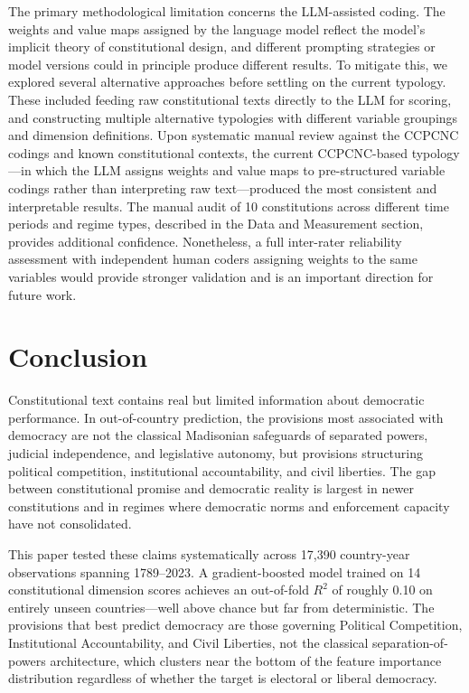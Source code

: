 \documentclass[9pt,twoside]{pnas-new}
\begin{document}
The primary methodological limitation concerns the LLM-assisted coding. The weights and value maps assigned by the language model reflect the model's implicit theory of constitutional design, and different prompting strategies or model versions could in principle produce different results. To mitigate this, we explored several alternative approaches before settling on the current typology. These included feeding raw constitutional texts directly to the LLM for scoring, and constructing multiple alternative typologies with different variable groupings and dimension definitions. Upon systematic manual review against the CCPCNC codings and known constitutional contexts, the current CCPCNC-based typology---in which the LLM assigns weights and value maps to pre-structured variable codings rather than interpreting raw text---produced the most consistent and interpretable results. The manual audit of 10 constitutions across different time periods and regime types, described in the Data and Measurement section, provides additional confidence. Nonetheless, a full inter-rater reliability assessment with independent human coders assigning weights to the same variables would provide stronger validation and is an important direction for future work.

\section*{Conclusion}

Constitutional text contains real but limited information about democratic performance. In out-of-country prediction, the provisions most associated with democracy are not the classical Madisonian safeguards of separated powers, judicial independence, and legislative autonomy, but provisions structuring political competition, institutional accountability, and civil liberties. The gap between constitutional promise and democratic reality is largest in newer constitutions and in regimes where democratic norms and enforcement capacity have not consolidated.

This paper tested these claims systematically across 17,390 country-year observations spanning 1789--2023. A gradient-boosted model trained on 14 constitutional dimension scores achieves an out-of-fold $R^2$ of roughly 0.10 on entirely unseen countries---well above chance but far from deterministic. The provisions that best predict democracy are those governing Political Competition, Institutional Accountability, and Civil Liberties, not the classical separation-of-powers architecture, which clusters near the bottom of the feature importance distribution regardless of whether the target is electoral or liberal democracy.
\end{document}
